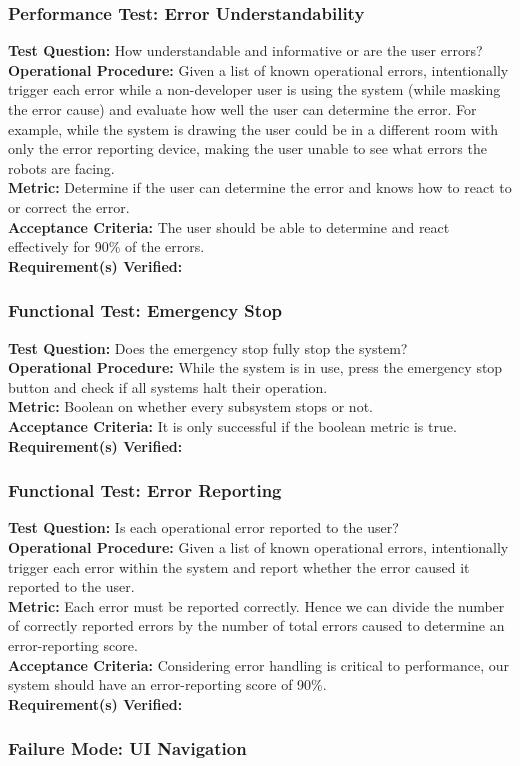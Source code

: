 \subsubsection{Performance Test: Error Understandability}
\label{sec:ui_pt_error_understand}
\textbf{Test Question:} How understandable and informative or are the user errors?\\
\textbf{Operational Procedure:} Given a list of known operational errors, intentionally trigger each error while a non-developer user is using the system (while masking the error cause) and evaluate how well the user can determine the error. For example, while the system is drawing the user could be in a different room with only the error reporting device, making the user unable to see what errors the robots are facing.\\
\textbf{Metric:}  Determine if the user can determine the error and knows how to react to or correct the error. \\
\textbf{Acceptance Criteria:}  The user should be able to determine and react effectively for 90\% of the errors.\\
\textbf{Requirement(s) Verified:} \\

\subsubsection{Functional Test: Emergency Stop}
\label{sec:ui_ft_emergency_stop}
\textbf{Test Question:} Does the emergency stop fully stop the system? \\
\textbf{Operational Procedure:} While the system is in use, press the emergency stop button and check if all systems halt their operation. \\
\textbf{Metric:} Boolean on whether every subsystem stops or not. \\
\textbf{Acceptance Criteria:} It is only successful if the boolean metric is true. \\
\textbf{Requirement(s) Verified:}  \\

\subsubsection{Functional Test: Error Reporting}
\label{sec:ui_ft_error_reporting}
\textbf{Test Question:} Is each operational error reported to the user? \\
\textbf{Operational Procedure:} Given a list of known operational errors, intentionally trigger each error within the system and report whether the error caused it reported to the user. \\
\textbf{Metric:} Each error must be reported correctly. Hence we can divide the number of correctly reported errors by the number of total errors caused to determine an error-reporting score.  \\
\textbf{Acceptance Criteria:} Considering error handling is critical to performance, our system should have an error-reporting score of 90\%. \\
\textbf{Requirement(s) Verified:}  \\

\subsubsection{Failure Mode: UI Navigation}
\label{sec:ui_fm_navigation}
